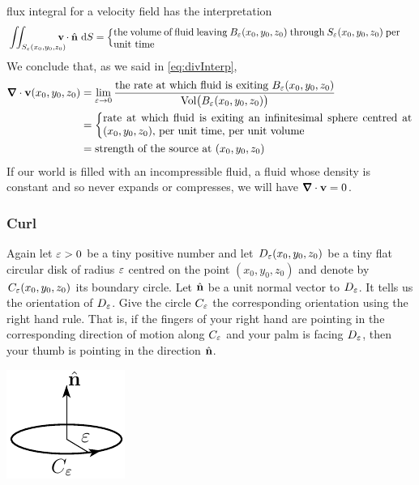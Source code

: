 flux integral for a velocity field has the interpretation
\begin{align*}
\dblInt_{S_\veps(x_0,y_0,z_0)}\hskip-10 pt \vv\cdot\hn \ \dee{S}
&=\left\{\parbox[c]{10.0cm}{the volume of fluid leaving 
         $B_\veps(x_0,y_0,z_0)$ through
         $S_\veps(x_0,y_0,z_0)$ per unit time}\right.
\end{align*}
We conclude that, as we said in \eqref{eq:divInterp},
\begin{align*}
\vnabla\cdot\vv(x_0,y_0,z_0)
&=\lim_{\veps\rightarrow 0}
\frac{\text{the rate at which fluid is exiting $B_\veps(x_0,y_0,z_0)$}}
{\text{Vol}\big(B_\veps(x_0,y_0,z_0)\big)}
\\
&=\left\{\parbox[c]{10.0cm}{rate at which fluid is exiting
                        an infinitesimal sphere centred at $(x_0,y_0,z_0)$, 
                        per unit time, per unit volume}
\right. \\
&=\text{strength of the source at $(x_0,y_0,z_0)$}
\end{align*}
If our world is filled with an incompressible fluid, a fluid whose density
is constant and so never expands or compresses, we will have
$\vnabla\cdot\vv=0$.

\subsubsection{Curl}
Again let $\varepsilon>0$ be a tiny positive number and let $D_\varepsilon(x_0,y_0,z_0)$ 
be a tiny flat circular disk of radius $\varepsilon$ 
centred on the point  $(x_0,y_0,z_0)$ and denote by $C_\varepsilon(x_0,y_0,z_0)$ 
its boundary circle. Let $\hat{\mathbf{n}}$ be a unit normal vector to $D_\varepsilon$. It 
tells us the orientation of $D_\varepsilon$. Give the circle $C_\varepsilon$ the 
corresponding orientation using the right hand rule.
That is, if the fingers of your right hand are pointing in the corresponding
direction of motion along $C_\varepsilon$ and your palm is facing $D_\varepsilon$, then 
your thumb is pointing in the direction $\hat{\mathbf{n}}$.
\begin{nfig}
\begin{center}
    \includegraphics{prepaddle.pdf}
\end{center}
\end{nfig}


